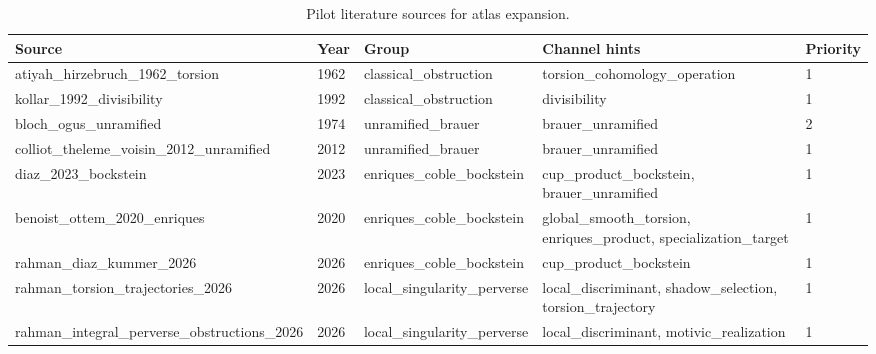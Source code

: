 \begin{table}[h]
\centering
\caption{Pilot literature sources for atlas expansion.}
\label{tab:pilot-literature-sources}
\footnotesize
\renewcommand{\arraystretch}{1.18}
\begin{tabular}{|p{}|p{}|p{}|p{}|p{}|}
\hline
\centering\textbf{Source} & \centering\textbf{Year} & \centering\textbf{Group} & \centering\textbf{Channel hints} & \centering\arraybackslash\textbf{Priority} \\
\hline
atiyah\_\allowbreak{}hirzebruch\_\allowbreak{}1962\_\allowbreak{}torsion & 1962 & classical\_\allowbreak{}obstruction & torsion\_\allowbreak{}cohomology\_\allowbreak{}operation & 1 \\
kollar\_\allowbreak{}1992\_\allowbreak{}divisibility & 1992 & classical\_\allowbreak{}obstruction & divisibility & 1 \\
bloch\_\allowbreak{}ogus\_\allowbreak{}unramified & 1974 & unramified\_\allowbreak{}brauer & brauer\_\allowbreak{}unramified & 2 \\
colliot\_\allowbreak{}theleme\_\allowbreak{}voisin\_\allowbreak{}2012\_\allowbreak{}unramified & 2012 & unramified\_\allowbreak{}brauer & brauer\_\allowbreak{}unramified & 1 \\
diaz\_\allowbreak{}2023\_\allowbreak{}bockstein & 2023 & enriques\_\allowbreak{}coble\_\allowbreak{}bockstein & cup\_\allowbreak{}product\_\allowbreak{}bockstein, brauer\_\allowbreak{}unramified & 1 \\
benoist\_\allowbreak{}ottem\_\allowbreak{}2020\_\allowbreak{}enriques & 2020 & enriques\_\allowbreak{}coble\_\allowbreak{}bockstein & global\_\allowbreak{}smooth\_\allowbreak{}torsion, enriques\_\allowbreak{}product, specialization\_\allowbreak{}target & 1 \\
rahman\_\allowbreak{}diaz\_\allowbreak{}kummer\_\allowbreak{}2026 & 2026 & enriques\_\allowbreak{}coble\_\allowbreak{}bockstein & cup\_\allowbreak{}product\_\allowbreak{}bockstein & 1 \\
rahman\_\allowbreak{}torsion\_\allowbreak{}trajectories\_\allowbreak{}2026 & 2026 & local\_\allowbreak{}singularity\_\allowbreak{}perverse & local\_\allowbreak{}discriminant, shadow\_\allowbreak{}selection, torsion\_\allowbreak{}trajectory & 1 \\
rahman\_\allowbreak{}integral\_\allowbreak{}perverse\_\allowbreak{}obstructions\_\allowbreak{}2026 & 2026 & local\_\allowbreak{}singularity\_\allowbreak{}perverse & local\_\allowbreak{}discriminant, motivic\_\allowbreak{}realization & 1 \\

\end{tabular}
\end{table}
